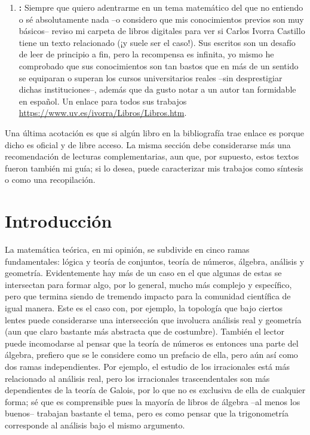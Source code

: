 \documentclass[11pt,oneside]{book}
\begin{document}
\begin{enumerate}[1.]
\item{\bfseries\cite{castilloalgebra}:} Siempre que quiero adentrarme en un tema matemático del que no entiendo o sé absolutamente nada --o considero que mis conocimientos previos son muy básicos-- reviso mi carpeta de libros digitales para ver si Carlos Ivorra Castillo tiene un texto relacionado (¡y suele ser el caso!). Sus escritos son un desafío de leer de principio a fin, pero la recompensa es infinita, yo mismo he comprobado que sus conocimientos son tan bastos que en más de un sentido se equiparan o superan los cursos universitarios reales --sin desprestigiar dichas instituciones--, además que da gusto notar a un autor tan formidable en español. Un enlace para todos sus trabajos \url{https://www.uv.es/ivorra/Libros/Libros.htm}.
\end{enumerate}
Una última acotación es que si algún libro en la bibliografía trae enlace es porque dicho es oficial y de libre acceso. La misma sección debe considerarse más una recomendación de lecturas complementarias, aun que, por supuesto, estos textos fueron también mi guía; si lo desea, puede caracterizar mis trabajos como síntesis o como una recopilación.

\chapter{Introducción}
La matemática teórica, en mi opinión, se subdivide en cinco ramas fundamentales: lógica y teoría de conjuntos, teoría de números, álgebra, análisis y geometría. Evidentemente hay más de un caso en el que algunas de estas se intersectan para formar algo, por lo general, mucho más complejo y específico, pero que termina siendo de tremendo impacto para la comunidad científica de igual manera. Este es el caso con, por ejemplo, la topología que bajo ciertos lentes puede considerarse una intersección que involucra análisis real y geometría (aun que claro bastante más abstracta que de costumbre). También el lector puede incomodarse al pensar que la teoría de números es entonces una parte del álgebra, prefiero que se le considere como un prefacio de ella, pero aún así como dos ramas independientes. Por ejemplo, el estudio de los irracionales está más relacionado al análisis real, pero los irracionales trascendentales son más dependientes de la teoría de Galois, por lo que no es exclusiva de ella de cualquier forma; sé que es comprensible pues la mayoría de libros de álgebra --al menos los buenos-- trabajan bastante el tema, pero es como pensar que la trigonometría corresponde al análisis bajo el mismo argumento.
\end{document}
